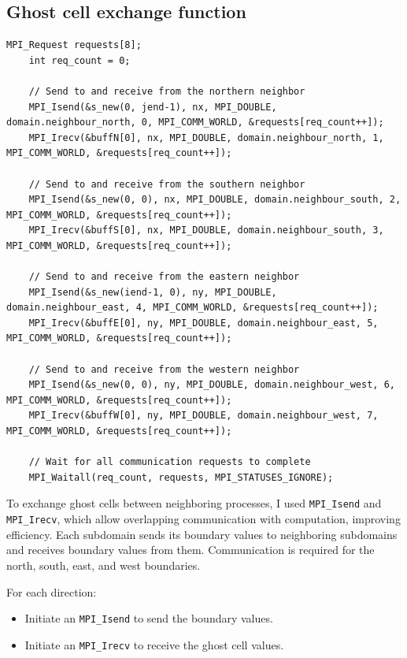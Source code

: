 \documentclass[unicode,11pt,a4paper,oneside,numbers=endperiod,openany]{scrartcl}
\begin{document}
\subsection{Ghost cell exchange function}
\begin{lstlisting}[style=mystyle, language=MyC++, caption={Non-Blocking Communication for Neighbor Exchange}]
    MPI_Request requests[8];
    int req_count = 0;
    
    // Send to and receive from the northern neighbor
    MPI_Isend(&s_new(0, jend-1), nx, MPI_DOUBLE, domain.neighbour_north, 0, MPI_COMM_WORLD, &requests[req_count++]);
    MPI_Irecv(&buffN[0], nx, MPI_DOUBLE, domain.neighbour_north, 1, MPI_COMM_WORLD, &requests[req_count++]);
    
    // Send to and receive from the southern neighbor
    MPI_Isend(&s_new(0, 0), nx, MPI_DOUBLE, domain.neighbour_south, 2, MPI_COMM_WORLD, &requests[req_count++]);
    MPI_Irecv(&buffS[0], nx, MPI_DOUBLE, domain.neighbour_south, 3, MPI_COMM_WORLD, &requests[req_count++]);
    
    // Send to and receive from the eastern neighbor
    MPI_Isend(&s_new(iend-1, 0), ny, MPI_DOUBLE, domain.neighbour_east, 4, MPI_COMM_WORLD, &requests[req_count++]);
    MPI_Irecv(&buffE[0], ny, MPI_DOUBLE, domain.neighbour_east, 5, MPI_COMM_WORLD, &requests[req_count++]);
    
    // Send to and receive from the western neighbor
    MPI_Isend(&s_new(0, 0), ny, MPI_DOUBLE, domain.neighbour_west, 6, MPI_COMM_WORLD, &requests[req_count++]);
    MPI_Irecv(&buffW[0], ny, MPI_DOUBLE, domain.neighbour_west, 7, MPI_COMM_WORLD, &requests[req_count++]);
    
    // Wait for all communication requests to complete
    MPI_Waitall(req_count, requests, MPI_STATUSES_IGNORE);
\end{lstlisting}

To exchange ghost cells between neighboring processes, I used \texttt{MPI\_Isend} and \texttt{MPI\_Irecv}, which allow overlapping communication with computation, improving efficiency. Each subdomain sends its boundary values to neighboring subdomains and receives boundary values from them. Communication is required for the north, south, east, and west boundaries. 

For each direction:
\begin{itemize}
    \item Initiate an \texttt{MPI\_Isend} to send the boundary values.
    \item Initiate an \texttt{MPI\_Irecv} to receive the ghost cell values.
\end{itemize}
\end{document}
